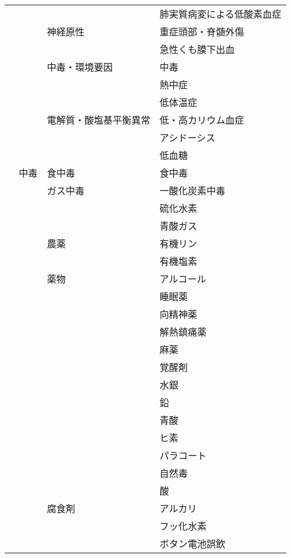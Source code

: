 \begin{xltabular}{\linewidth}{XXXX}
 &  &  & 肺実質病変による低酸素血症 \\
 &  & 神経原性 & 重症頭部・脊髄外傷 \\
 &  &  & 急性くも膜下出血 \\
 &  & 中毒・環境要因 & 中毒 \\
 &  &  & 熱中症 \\
 &  &  & 低体温症 \\
 &  & 電解質・酸塩基平衡異常 & 低・高カリウム血症 \\
 &  &  & アシドーシス \\
 &  &  & 低血糖 \\
 & 中毒 & 食中毒 & 食中毒 \\
 &  & ガス中毒 & 一酸化炭素中毒 \\
 &  &  & 硫化水素 \\
 &  &  & 青酸ガス \\
 &  & 農薬 & 有機リン \\
 &  &  & 有機塩素 \\
 &  & 薬物 & アルコール \\
 &  &  & 睡眠薬 \\
 &  &  & 向精神薬 \\
 &  &  & 解熱鎮痛薬 \\
 &  &  & 麻薬 \\
 &  &  & 覚醒剤 \\
 &  &  & 水銀 \\
 &  &  & 鉛 \\
 &  &  & 青酸 \\
 &  &  & ヒ素 \\
 &  &  & パラコート \\
 &  &  & 自然毒 \\
 &  &  & 酸 \\
 &  & 腐食剤 & アルカリ \\
 &  &  & フッ化水素 \\
 &  &  & ボタン電池誤飲 \\
\bottomrule
\end{xltabular}




